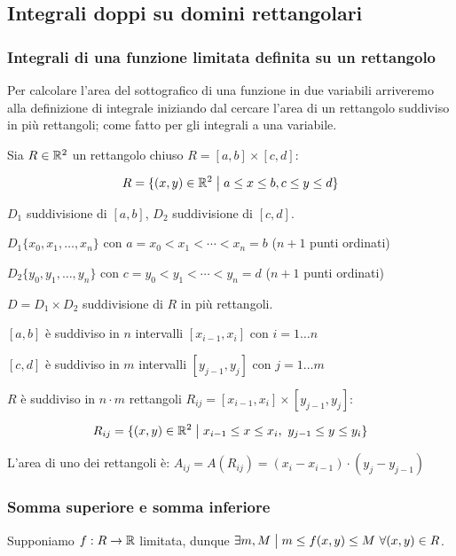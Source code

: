 \subsection{Integrali doppi su domini rettangolari}

\subsubsection{Integrali di una funzione limitata definita su un rettangolo}

Per calcolare l'area del sottografico di una funzione in due variabili arriveremo alla definizione di integrale iniziando dal cercare l'area di un rettangolo suddiviso in più rettangoli; come fatto per gli integrali a una variabile.

Sia \(R \in \mathbb{R}^2\) un rettangolo chiuso \(R = [a,b]\times [c,d]\):

\[
    R = \{(x,y) \in \mathbb{R}^2 \;\big|\; a \le x \le b, c \le y \le d \}
\]

\(D_1\) suddivisione di \([a,b]\), \(D_2\) suddivisione di \([c,d]\).

\(D_1 \{x_0,x_1,\ldots,x_n\} \) con \(a = x_0 < x_1 < \cdots < x_n = b\) (\(n+1\) punti ordinati)

\(D_2 \{y_0,y_1,\ldots,y_n\} \) con \(c = y_0 < y_1 < \cdots < y_n = d\) (\(n+1\) punti ordinati)


\(D = D_1 \times D_2\) suddivisione di \(R\) in più rettangoli.

\([a,b]\) è suddiviso in \(n\) intervalli \([x_{i-1}, x_i]\) con \(i = 1 \ldots n\)

\([c,d]\) è suddiviso in \(m\) intervalli \([y_{j-1}, y_j]\) con \(j = 1 \ldots m\)

\(R\) è suddiviso in \(n\cdot m\) rettangoli \(R_{ij} = [x_{i-1}, x_i] \times [y_{j-1}, y_j]\):

\[
    R_{ij} = \{(x,y) \in \mathbb{R}^2 \;\big|\; x_{i-1} \le x \le x_i,\ y_{j-1} \le  y \le y_i\}
\]

L'area di uno dei rettangoli è: \(A_{ij} = A(R_{ij}) = (x_i - x_{i-1}) \cdot (y_j - y_{j-1})\)

\filbreak{}
\subsubsection{Somma superiore e somma inferiore}

Supponiamo \(f: R \to \mathbb{R} \) limitata, dunque \(\exists m,M \;\big|\; m \le f(x,y) \le M ~\forall (x,y) \in R\).

